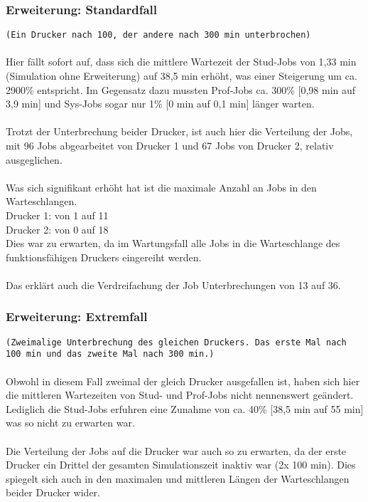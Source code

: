 \documentclass[12pt,a4paper]{article}
\begin{document}
	
	\subsubsection{Erweiterung: Standardfall}
	\texttt{(Ein Drucker nach 100, der andere nach 300 min unterbrochen)}
	 \\ 
	 \\
	Hier fällt sofort auf, dass sich die mittlere Wartezeit der Stud-Jobs von 1,33 min (Simulation ohne Erweiterung)  auf 38,5 min erhöht, was einer Steigerung um ca. 2900\% entspricht. Im Gegensatz dazu
	mussten Prof-Jobs ca. 300\% [0,98 min auf 3,9 min] und Sys-Jobs sogar nur 1\% [0 min auf 0,1 min] länger warten.\\
	\\
	Trotzt der Unterbrechung beider Drucker, ist auch hier die Verteilung der Jobs, mit 96 Jobs abgearbeitet von Drucker 1 und 67 Jobs von Drucker 2, relativ ausgeglichen.\\
	\\
	Was sich signifikant erhöht hat ist die maximale Anzahl an Jobs in den Warteschlangen. \\
	Drucker 1: von 1 auf 11\\
	Drucker 2: von 0 auf 18\\
	Dies war zu erwarten, da im Wartungsfall alle Jobs in die Warteschlange des funktionsfähigen Druckers eingereiht werden.\\
	\\
	Das erklärt auch die Verdreifachung der Job Unterbrechungen von 13 auf 36.
	
	\subsubsection{Erweiterung: Extremfall}
	\texttt{(Zweimalige Unterbrechung des gleichen Druckers. Das erste Mal nach 100 min und das zweite Mal nach 300 min.)}
	\\ \\
	Obwohl in diesem Fall zweimal der gleich Drucker ausgefallen ist, haben sich hier die mittleren Wartezeiten von Stud- und Prof-Jobs nicht nennenswert geändert. Lediglich die Stud-Jobs erfuhren eine
	Zunahme von ca. 40\% [38,5 min auf 55 min] was so nicht zu erwarten war.\\
	\\
	Die Verteilung der Jobs auf die Drucker war auch so zu erwarten, da der erste Drucker ein Drittel der gesamten Simulationszeit inaktiv war (2x 100 min). Dies spiegelt sich auch in den maximalen und
	mittleren Längen der Warteschlangen beider Drucker wider.
	 
\end{document}
